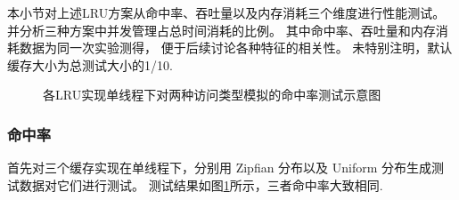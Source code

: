 本小节对上述LRU方案从命中率、吞吐量以及内存消耗三个维度进行性能测试。
并分析三种方案中并发管理占总时间消耗的比例。
其中命中率、吞吐量和内存消耗数据为同一次实验测得，
便于后续讨论各种特征的相关性。
未特别注明，默认缓存大小为总测试大小的1/10.

\begin{figure}
    \caption{各LRU实现单线程下对两种访问类型模拟的命中率测试示意图}
    \label{fig:dist_on_3_1thread}
\end{figure}

\subsubsection{命中率}

首先对三个缓存实现在单线程下，分别用 Zipfian 分布以及 Uniform 分布生成测试数据对它们进行测试。
测试结果如图\ref{fig:dist_on_3_1thread}所示，三者命中率大致相同.





